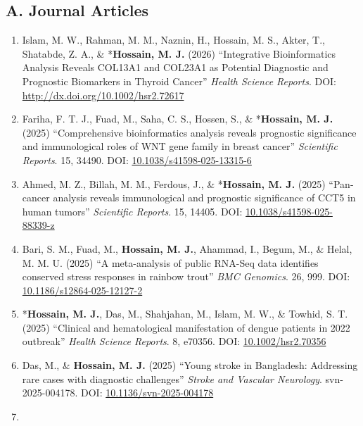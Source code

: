 \documentclass[
  11pt,
  letterpaper,
  DIV=11,
  numbers=noendperiod]{scrartcl}
\providecommand{\tightlist}{%
  \setlength{\itemsep}{0pt}\setlength{\parskip}{0pt}}
\begin{document}
\subsection{A. Journal Articles}\label{a.-journal-articles}

\begin{enumerate}
\def\labelenumi{\arabic{enumi}.}
\tightlist
\item
  Islam, M. W., Rahman, M. M., Naznin, H., Hossain, M. S., Akter, T.,
  Shatabde, Z. A., \& *\textbf{Hossain, M. J.} (2026) ``Integrative
  Bioinformatics Analysis Reveals COL13A1 and COL23A1 as Potential
  Diagnostic and Prognostic Biomarkers in Thyroid Cancer'' \emph{Health
  Science Reports}. DOI:
  \href{https://doi.org/http://dx.doi.org/10.1002/hsr2.72617}{http://dx.doi.org/10.1002/hsr2.72617}
\item
  Fariha, F. T. J., Fuad, M., Saha, C. S., Hossen, S., \&
  *\textbf{Hossain, M. J.} (2025) ``Comprehensive bioinformatics
  analysis reveals prognostic significance and immunological roles of
  WNT gene family in breast cancer'' \emph{Scientific Reports}. 15,
  34490. DOI:
  \href{https://doi.org/10.1038/s41598-025-13315-6}{10.1038/s41598-025-13315-6}
\item
  Ahmed, M. Z., Billah, M. M., Ferdous, J., \& *\textbf{Hossain, M. J.}
  (2025) ``Pan-cancer analysis reveals immunological and prognostic
  significance of CCT5 in human tumors'' \emph{Scientific Reports}. 15,
  14405. DOI:
  \href{https://doi.org/10.1038/s41598-025-88339-z}{10.1038/s41598-025-88339-z}
\item
  Bari, S. M., Fuad, M., \textbf{Hossain, M. J.}, Ahammad, I., Begum,
  M., \& Helal, M. M. U. (2025) ``A meta-analysis of public RNA-Seq data
  identifies conserved stress responses in rainbow trout'' \emph{BMC
  Genomics}. 26, 999. DOI:
  \href{https://doi.org/10.1186/s12864-025-12127-2}{10.1186/s12864-025-12127-2}
\item
  *\textbf{Hossain, M. J.}, Das, M., Shahjahan, M., Islam, M. W., \&
  Towhid, S. T. (2025) ``Clinical and hematological manifestation of
  dengue patients in 2022 outbreak'' \emph{Health Science Reports}. 8,
  e70356. DOI:
  \href{https://doi.org/10.1002/hsr2.70356}{10.1002/hsr2.70356}
\item
  Das, M., \& \textbf{Hossain, M. J.} (2025) ``Young stroke in
  Bangladesh: Addressing rare cases with diagnostic challenges''
  \emph{Stroke and Vascular Neurology}. svn-2025-004178. DOI:
  \href{https://doi.org/10.1136/svn-2025-004178}{10.1136/svn-2025-004178}
\item

\end{enumerate}
\end{document}
